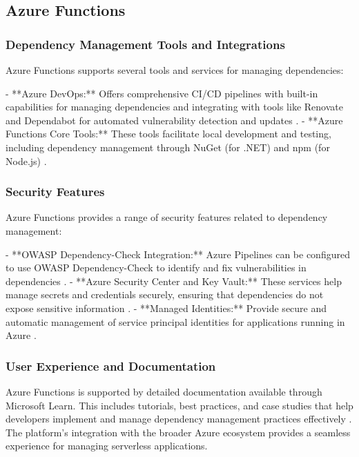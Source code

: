\documentclass[sigconf]{acmart}
\begin{document}
\subsection{Azure Functions}

\subsubsection{Dependency Management Tools and Integrations}

Azure Functions supports several tools and services for managing dependencies:

- **Azure DevOps:** Offers comprehensive CI/CD pipelines with built-in capabilities for managing dependencies and integrating with tools like Renovate and Dependabot for automated vulnerability detection and updates \cite{azureDevOps2023}.
- **Azure Functions Core Tools:** These tools facilitate local development and testing, including dependency management through NuGet (for .NET) and npm (for Node.js) \cite{azureCoreTools2023}.

\subsubsection{Security Features}

Azure Functions provides a range of security features related to dependency management:

- **OWASP Dependency-Check Integration:** Azure Pipelines can be configured to use OWASP Dependency-Check to identify and fix vulnerabilities in dependencies \cite{azureowasp2023}.
- **Azure Security Center and Key Vault:** These services help manage secrets and credentials securely, ensuring that dependencies do not expose sensitive information \cite{azureSecurity2023}.
- **Managed Identities:** Provide secure and automatic management of service principal identities for applications running in Azure \cite{azureManagedIdentities2023}.

\subsubsection{User Experience and Documentation}

Azure Functions is supported by detailed documentation available through Microsoft Learn. This includes tutorials, best practices, and case studies that help developers implement and manage dependency management practices effectively \cite{azureLearn2023}. The platform's integration with the broader Azure ecosystem provides a seamless experience for managing serverless applications.
\end{document}
